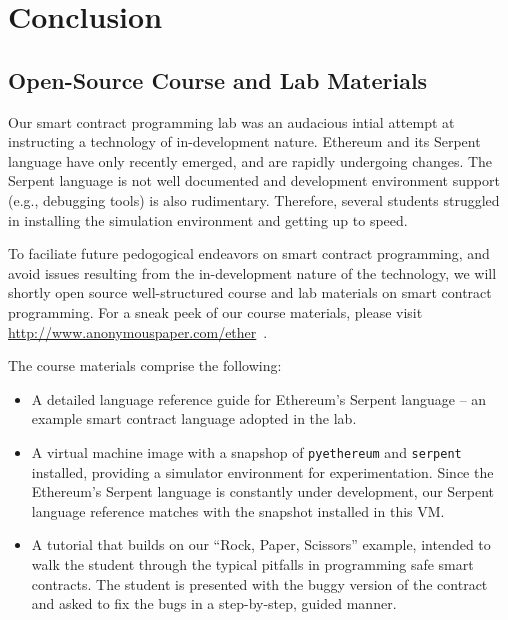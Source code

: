 \documentclass[10pt,twocolumn,letterpaper]{article}
\newcommand{\elaine}[1]{{\color{red}{[elaine: #1]}}}
\newcommand{\ignore}[1]{}
\begin{document}
\ignore{
\subsection{Fixed ``Rock, Paper, Scissors'' Contract} 
The full, fixed ``Rock, Paper, Scissors'' contract
is included in our open-source lab materials
available at 
\elaine{fill in anonymous url}.
}
\section{Conclusion}
\subsection{Open-Source Course and Lab Materials}
Our smart contract programming lab was an audacious 
intial  attempt 
at instructing a technology of in-development nature.
Ethereum and its Serpent language
have only recently emerged, and are 
rapidly undergoing changes. 
The Serpent language is not well documented and development
environment support (e.g., debugging tools) 
is also rudimentary.
Therefore, several students struggled 
in installing the simulation environment and 
getting up to speed.

To faciliate future pedogogical endeavors on smart contract programming,
and avoid issues resulting from the in-development nature of the technology, 
we will shortly open source well-structured course and lab materials on
smart contract programming.
For a sneak peek of our course 
materials, please visit 
\url{http://www.anonymouspaper.com/ether}~\cite{anonymous}.

The course materials comprise the following:
\begin{itemize}[leftmargin=5mm]
\item
A detailed language reference 
guide for Ethereum's Serpent language -- an example
smart contract language adopted in the lab.
\item
A virtual machine image with a snapshop of {\tt pyethereum} and {\tt serpent} installed,
providing a simulator environment for experimentation.
Since the Ethereum's Serpent language is constantly
under development, our Serpent language
reference matches with the snapshot installed in this VM. 
\item
A tutorial that 
builds on our ``Rock, Paper, Scissors'' example, 
intended to 
walk the student through the typical pitfalls
in programming safe smart contracts.
The student is presented with the buggy version of the contract
and asked to fix the bugs in a step-by-step, guided manner.
\end{itemize}
\end{document}
